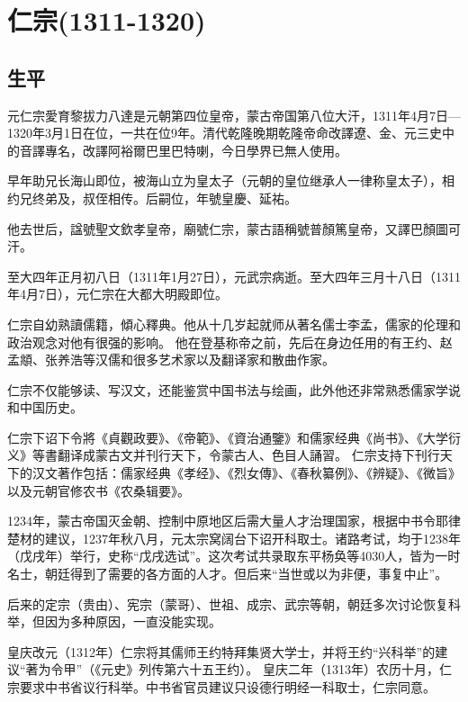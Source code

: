 
\section{仁宗\tiny(1311-1320)}

\subsection{生平}

元仁宗愛育黎拔力八達是元朝第四位皇帝，蒙古帝国第八位大汗，1311年4月7日—1320年3月1日在位，一共在位9年。清代乾隆晚期乾隆帝命改譯遼、金、元三史中的音譯專名，改譯阿裕爾巴里巴特喇，今日學界已無人使用。

早年助兄长海山即位，被海山立为皇太子（元朝的皇位继承人一律称皇太子），相约兄终弟及，叔侄相传。后嗣位，年號皇慶、延祐。

他去世后，諡號聖文欽孝皇帝，廟號仁宗，蒙古語稱號普顏篤皇帝，又譯巴顏圖可汗。

至大四年正月初八日（1311年1月27日），元武宗病逝。至大四年三月十八日（1311年4月7日），元仁宗在大都大明殿即位。

仁宗自幼熟讀儒籍，傾心釋典。他从十几岁起就师从著名儒士李孟，儒家的伦理和政治观念对他有很强的影响。 他在登基称帝之前，先后在身边任用的有王约、赵孟頫、张养浩等汉儒和很多艺术家以及翻译家和散曲作家。

仁宗不仅能够读、写汉文，还能鉴赏中国书法与绘画，此外他还非常熟悉儒家学说和中国历史。

仁宗下诏下令將《貞觀政要》、《帝範》、《資治通鑒》和儒家经典《尚书》、《大学衍义》等書翻译成蒙古文并刊行天下，令蒙古人、色目人誦習。 仁宗支持下刊行天下的汉文著作包括：儒家经典《孝经》、《烈女傳》、《春秋纂例》、《辨疑》、《微旨》以及元朝官修农书《农桑辑要》。

1234年，蒙古帝国灭金朝、控制中原地区后需大量人才治理国家，根据中书令耶律楚材的建议，1237年秋八月，元太宗窝阔台下诏开科取士。诸路考试，均于1238年（戊戌年）举行，史称“戊戌选试”。这次考试共录取东平杨奂等4030人，皆为一时名士，朝廷得到了需要的各方面的人才。但后来“当世或以为非便，事复中止”。

后来的定宗（贵由）、宪宗（蒙哥）、世祖、成宗、武宗等朝，朝廷多次讨论恢复科举，但因为多种原因，一直没能实现。

皇庆改元（1312年）仁宗将其儒师王约特拜集贤大学士，并将王约“兴科举”的建议“著为令甲”（《元史》列传第六十五王约）。 皇庆二年（1313年）农历十月，仁宗要求中书省议行科举。中书省官员建议只设德行明经一科取士，仁宗同意。

